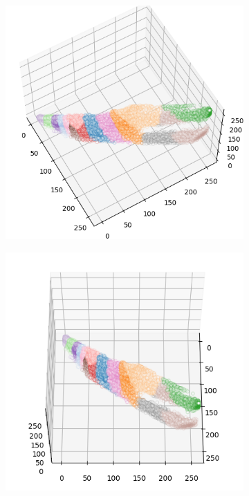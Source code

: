 \begin{figure}[htbp]
\begin{subfigure}[t]{0.32\textwidth}
    \end{subfigure}
    \begin{subfigure}[t]{0.32\textwidth}
        \includegraphics[width=\linewidth]{../../python_code/plots/kmeans/horse-139/clusters_elev60_azim-30.png}
    \end{subfigure}
    \begin{subfigure}[t]{0.32\textwidth}
        \includegraphics[width=\linewidth]{../../python_code/plots/kmeans/horse-139/clusters_elev60_azim0.png}
    \end{subfigure}
\end{figure}


